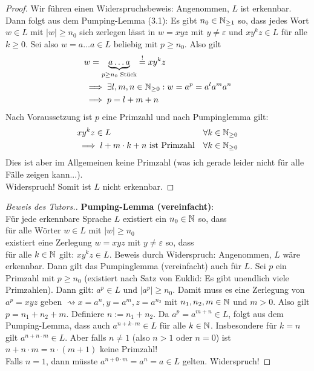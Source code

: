 \begin{proof}
	Wir führen einen Widerspruchsbeweis: Angenommen, $L$ ist erkennbar.
	Dann folgt aus dem Pumping-Lemma (3.1): Es gibt $n_0\in\mathbb{N}_{\geq1}$ so, dass jedes Wort $w\in L$ mit $|w|\geq n_0$ sich zerlegen lässt in $w=xyz$ mit $y\neq\varepsilon$ und $xy^kz\in L$ für alle $k\geq0$.
	Sei also $w=a\ldots a\in L$ beliebig mit $p\geq n_0$. Also gilt
	\begin{align*}
		&w=\underbrace{a\ldots a}_{p\geq n_0\text{ Stück}}\overset{!}= xy^k z\\
		&\implies \exists l,m,n\in\mathbb{N}_{\geq0}: w=a^p=a^l a^m a^n\\
		&\implies p=l+m+n
	\end{align*}
	Nach Voraussetzung ist $p$ eine Primzahl und nach Pumpinglemma gilt:
	\begin{align*}
		&x y^k z\in L &\forall k\in\mathbb{N}_{\geq0}\\
		&\implies l+m\cdot k+ n\text{ ist Primzahl} &\forall k\in\mathbb{N}_{\geq0}
	\end{align*}
	Dies ist aber im Allgemeinen keine Primzahl (was ich gerade leider nicht für alle Fälle zeigen kann...).\\
	Widerspruch! Somit ist $L$ nicht erkennbar.
\end{proof}

\begin{proof}[Beweis des Tutors.]\enter
	\textbf{Pumping-Lemma (vereinfacht)}:\\
	Für jede erkennbare Sprache $L$ existiert ein $n_0\in\mathbb{N}$ so, dass\\
	für alle Wörter $w\in L$ mit $|w|\geq n_0$\\
	existiert eine Zerlegung $w=xyz$ mit $y\neq\varepsilon$ so, dass\\
	für alle $k\in\mathbb{N}$ gilt: $xy^kz\in L$.\nl
	Beweis durch Widerspruch:
	Angenommen, $L$ wäre erkennbar. Dann gilt das Pumpinglemma (vereinfacht) auch für $L$.
	Sei $p$ ein Primzahl mit $p\geq n_0$ (existiert nach Satz von Euklid: Es gibt unendlich viele Primzahlen).
	Dann gilt:
	$a^p\in L$ und $|a^p|\geq n_0$.
	Damit muss es eine Zerlegung von $a^p=xyz$ geben $\rightsquigarrow x=a^n,y=a^m,z=a^{n_2}$ mit $n_1,n_2,m\in\mathbb{N}$ und $m>0$.
	Also gilt $p=n_1+n_2+m$. 
	Definiere $n:=n_1+n_2$.
	Da $a^p=a^{m+n}\in L$, folgt aus dem Pumping-Lemma,
	dass auch $a^{n+k\cdot m}\in L$ für alle $k\in\mathbb{N}$.
	Insbesondere für $k=n$ %
	gilt $a^{n+n\cdot m}\in L$.
	Aber falls $n\neq1$ (also $n>1$ oder $n=0$) ist $n+n\cdot m=n\cdot(m+1)$ keine Primzahl!\\
	Falls $n=1$, dann müsste $a^{n+0\cdot m}=a^n=a\in L$ gelten. Widerspruch!
\end{proof}

